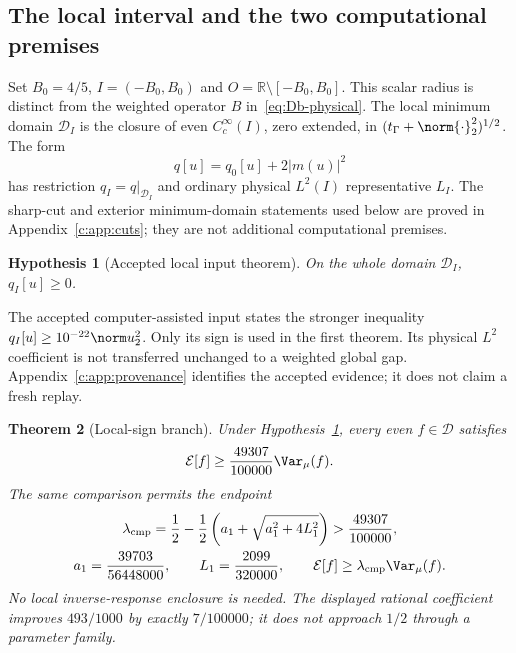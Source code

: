 \documentclass[11pt,a4paper]{article}
\numberwithin{equation}{section}
\newtheorem{theorem}{Theorem}[section]
\newtheorem{hypothesis}[theorem]{Hypothesis}
\theoremstyle{definition}\newtheorem{definition}[theorem]{Definition}
\theoremstyle{remark}\newtheorem{remark}[theorem]{Remark}
\newcommand{\R}{\mathbb R}\newcommand{\C}{\mathbb C}\newcommand{\N}{\mathbb N}
\newcommand{\E}{\mathcal E}\newcommand{\D}{\mathcal D}
\newcommand{\tg}{t_\Gamma}\newcommand{\cg}{c_\Gamma}
\begin{document}
\subsection{The local interval and the two computational premises}\label{c:sec:premises}
Set $B_0=4/5$, $I=(-B_0,B_0)$ and $O=\R\setminus[-B_0,B_0]$. This scalar radius is distinct from the weighted operator $B$ in~\eqref{eq:Db-physical}. The local minimum domain $\D_I$ is the closure of even $C_c^\infty(I)$, zero extended, in $(\tg+\norm{\cdot}_2^2)^{1/2}$. The form
\[
 q[u]=q_0[u]+2|m(u)|^2
\]
has restriction $q_I=q|_{\D_I}$ and ordinary physical $L^2(I)$ representative $L_I$. The sharp-cut and exterior minimum-domain statements used below are proved in Appendix~\ref{c:app:cuts}; they are not additional computational premises.


\begin{hypothesis}[Accepted local input theorem]\label{c:hyp:local}
On the whole domain $\D_I$, $q_I[u]\ge0$.
\end{hypothesis}
The accepted computer-assisted input states the stronger inequality $q_I[u]\ge10^{-22}\norm u_2^2$. Only its sign is used in the first theorem. Its physical $L^2$ coefficient is not transferred unchanged to a weighted global gap. Appendix~\ref{c:app:provenance} identifies the accepted evidence; it does not claim a fresh replay.

\begin{theorem}[Local-sign branch]\label{c:thm:localglobal}
Under Hypothesis~\ref{c:hyp:local}, every even $f\in\D$ satisfies
\begin{equation}\label{c:eq:49307}
 \E[f]\ge\frac{49307}{100000}\Var_\mu(f).
\end{equation}
The same comparison permits the endpoint
\begin{equation}\label{c:eq:lambdaendpoint}
 \begin{gathered}
 \lambda_{\rm cmp}=\frac12-\frac12\left(a_1+\sqrt{a_1^2+4L_1^2}\right)
 >\frac{49307}{100000},\\
 a_1=\frac{39703}{56448000},\qquad L_1=\frac{2099}{320000},\qquad
 \E[f]\ge\lambda_{\rm cmp}\Var_\mu(f).
 \end{gathered}
\end{equation}
No local inverse-response enclosure is needed. The displayed rational coefficient improves $493/1000$ by exactly $7/100000$; it does not approach $1/2$ through a parameter family.
\end{theorem}
\end{document}
